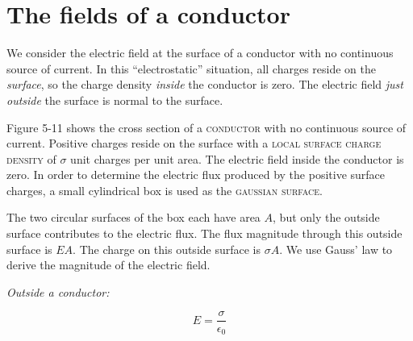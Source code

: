 \section{The fields of a conductor}

We consider the electric field at the surface
of a conductor with no continuous source of current.
In this ``electrostatic'' situation, all charges reside on the \emph{surface},
so the charge density \emph{inside} the conductor is zero.
The electric field \emph{just outside} the surface is normal to the surface.

Figure 5-11 shows the cross section of a \textsc{conductor} with no continuous source of current.
Positive charges reside on the surface with a \textsc{local surface charge density} of $\sigma$ 
unit charges per unit area.  The electric field inside the conductor is zero.
In order to determine the electric flux produced by the positive surface charges,
a small cylindrical box is used as the \textsc{gaussian surface}.

The two circular surfaces of the box each have area $A$,
but only the outside surface contributes to the electric flux.
The flux magnitude through this outside surface is $EA$.
The charge on this outside surface is $\sigma A$.
We use Gauss' law to derive the magnitude of the electric field.

\emph{Outside a conductor:}
\vspace{-1.5em}

\begin{equation}
  E = \frac{\sigma}{\epsilon_0}
\end{equation}

